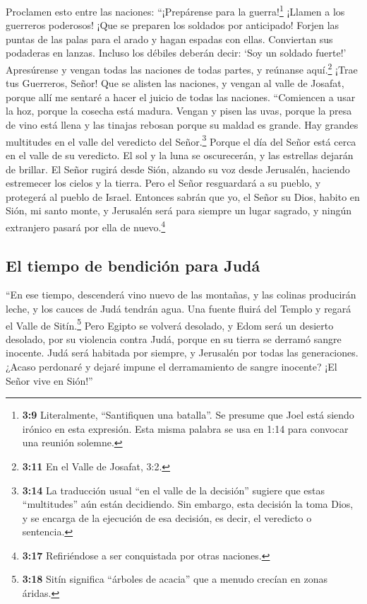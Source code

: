  Proclamen esto entre las naciones: ``¡Prepárense para la
guerra!\footnote{\textbf{3:9} Literalmente, ``Santifiquen una batalla''.
  Se presume que Joel está siendo irónico en esta expresión. Esta misma
  palabra se usa en 1:14 para convocar una reunión solemne.} ¡Llamen a
los guerreros poderosos! ¡Que se preparen los soldados por anticipado!
 Forjen las puntas de las palas para el arado y hagan
espadas con ellas. Conviertan sus podaderas en lanzas. Incluso los
débiles deberán decir: `Soy un soldado fuerte!' 
Apresúrense y vengan todas las naciones de todas partes, y reúnanse
aquí.\footnote{\textbf{3:11} En el Valle de Josafat, 3:2.} ¡Trae tus
Guerreros, Señor!  Que se alisten las naciones, y vengan
al valle de Josafat, porque allí me sentaré a hacer el juicio de todas
las naciones.  ``Comiencen a usar la hoz, porque la
cosecha está madura. Vengan y pisen las uvas, porque la presa de vino
está llena y las tinajas rebosan porque su maldad es grande.
 Hay grandes multitudes en el valle del veredicto del
Señor.\footnote{\textbf{3:14} La traducción usual ``en el valle de la
  decisión'' sugiere que estas ``multitudes'' aún están decidiendo. Sin
  embargo, esta decisión la toma Dios, y se encarga de la ejecución de
  esa decisión, es decir, el veredicto o sentencia.} Porque el día del
Señor está cerca en el valle de su veredicto.  El sol y
la luna se oscurecerán, y las estrellas dejarán de brillar.
 El Señor rugirá desde Sión, alzando su voz desde
Jerusalén, haciendo estremecer los cielos y la tierra. Pero el Señor
resguardará a su pueblo, y protegerá al pueblo de Israel.
 Entonces sabrán que yo, el Señor su Dios, habito en
Sión, mi santo monte, y Jerusalén será para siempre un lugar sagrado, y
ningún extranjero pasará por ella de nuevo.\footnote{\textbf{3:17}
  Refiriéndose a ser conquistada por otras naciones.}

\hypertarget{el-tiempo-de-bendiciuxf3n-para-juduxe1}{%
\subsection{El tiempo de bendición para
Judá}\label{el-tiempo-de-bendiciuxf3n-para-juduxe1}}

 ``En ese tiempo, descenderá vino nuevo de las montañas,
y las colinas producirán leche, y los cauces de Judá tendrán agua. Una
fuente fluirá del Templo y regará el Valle de Sitín.\footnote{\textbf{3:18}
  Sitín significa ``árboles de acacia'' que a menudo crecían en zonas
  áridas.}  Pero Egipto se volverá desolado, y Edom será
un desierto desolado, por su violencia contra Judá, porque en su tierra
se derramó sangre inocente.  Judá será habitada por
siempre, y Jerusalén por todas las generaciones.  ¿Acaso
perdonaré y dejaré impune el derramamiento de sangre inocente? ¡El Señor
vive en Sión!''
